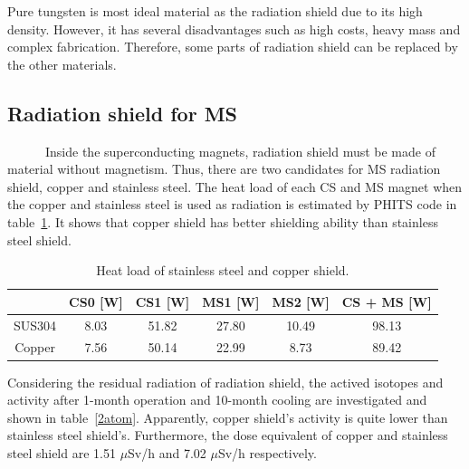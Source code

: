 Pure tungsten is most ideal material as the radiation shield due to its high density.
However, it has several disadvantages such as high costs, heavy mass and complex fabrication.
Therefore, some parts of radiation shield can be replaced by the other materials.

 \subsection{Radiation shield for MS}
~~~~~~Inside the superconducting magnets, radiation shield must be made of material without magnetism.
Thus, there are two candidates for MS radiation shield, copper and stainless steel.
The heat load of each CS and MS magnet when the copper and stainless steel is used as radiation is estimated by PHITS code in table~\ref{hrsload}.
It shows that copper shield has better shielding ability than stainless steel shield.
 \begin{table}[H]
 \centering
 \begin{tabular}{cccccc} \hline \hline
  & CS0 [W] & CS1 [W] & MS1 [W] & MS2 [W] & CS + MS [W] \\ \hline
  SUS304 & 8.03 & 51.82 & 27.80 & 10.49 & 98.13 \\
  Copper & 7.56 & 50.14 & 22.99 & 8.73 & 89.42 \\ \hline \hline
 \end{tabular}
 \caption{Heat load of stainless steel and copper shield.}
 \label{hrsload}
\end{table}
Considering the residual radiation of radiation shield, the actived isotopes and activity after 1-month operation and 10-month cooling are investigated and shown in table~\ref{2atom}.
Apparently, copper shield's activity is quite lower than stainless steel shield's.
Furthermore, the dose equivalent of copper and stainless steel shield are 1.51 $\mu$Sv/h and 7.02 $\mu$Sv/h respectively.

